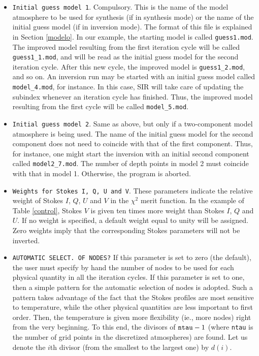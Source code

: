 \begin{itemize}
\item {\tt Initial guess model 1}. Compulsory. This is the name of the model
atmosphere to be used for synthesis (if in synthesis mode) or the name of 
the initial guess model (if in inversion mode). The format of this file is
explained in Section \ref{modelo}. In our example, the starting model
is called {\tt guess1.mod}. The improved model resulting from the first iteration
cycle will be called {\tt guess1\_1.mod}, and will be read as the initial guess model
for the second iteration cycle. After this new cycle, the improved model is
{\tt guess1\_2.mod}, and so on. An inversion run may be started with an initial
guess model called {\tt model\_4.mod}, for instance. In this case, SIR will take
care of updating the subindex whenever an iteration cycle has finished. Thus, the
improved model resulting from the first cycle will be called {\tt model\_5.mod}. 

\item {\tt Initial guess model 2}. Same as above, but only if a two-component 
model atmosphere is being used. The name of the initial guess model for the second
component does not need to coincide with that of the first component. Thus, 
for instance, one might start the inversion with an initial second component
called {\tt model2\_7.mod}. The number of depth points in model 2 must coincide
with that in model 1. Otherwise, the program is aborted.

\item {\tt Weights for Stokes I, Q, U and V}. These parameters indicate
the relative weight of Stokes $I$, $Q$, $U$ and $V$ in the $\chi^2$
merit function. In the example of Table \ref{control}, Stokes $V$ is
given ten times more weight than Stokes $I$, $Q$ and $U$. If no weight
is specified, a default weight equal to unity will be assigned. Zero
weights imply that the corresponding Stokes parameters will not be
inverted.

\item {\tt AUTOMATIC SELECT. OF NODES?} If this parameter is set to
zero (the default), the user must specify by hand the number of nodes
to be used for each physical quantity in all the iteration cycles. If this
parameter is set to one, then a simple pattern for the automatic
selection of nodes is adopted. Such a pattern takes advantage of the
fact that the Stokes profiles are most sensitive to temperature, while
the other physical quantities are less important to first order. Then,
the temperature is given more flexibility (ie., more nodes) right from
the very beginning. To this end, the divisors of ${\tt ntau} - 1$
(where {\tt ntau} is the number of grid points in the discretized
atmospheres) are found. Let us denote the $i$th divisor (from the
smallest to the largest one) by $d(i)$.


\end{itemize}

